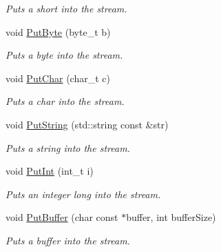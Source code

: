 \begin{DoxyCompactItemize}
\begin{DoxyCompactList}\small\item\em Puts a short into the stream. \end{DoxyCompactList}\item 
\hypertarget{class_common_1_1_network_serializer_ab5b1159c873c9edd318497c719eedc99}{void \hyperlink{class_common_1_1_network_serializer_ab5b1159c873c9edd318497c719eedc99}{Put\-Byte} (byte\-\_\-t b)}\label{class_common_1_1_network_serializer_ab5b1159c873c9edd318497c719eedc99}

\begin{DoxyCompactList}\small\item\em Puts a byte into the stream. \end{DoxyCompactList}\item 
\hypertarget{class_common_1_1_network_serializer_a35daf5250ffad493a6044d8089af1fc1}{void \hyperlink{class_common_1_1_network_serializer_a35daf5250ffad493a6044d8089af1fc1}{Put\-Char} (char\-\_\-t c)}\label{class_common_1_1_network_serializer_a35daf5250ffad493a6044d8089af1fc1}

\begin{DoxyCompactList}\small\item\em Puts a char into the stream. \end{DoxyCompactList}\item 
\hypertarget{class_common_1_1_network_serializer_a3fe79557a89ef5a84107802d3bf40a37}{void \hyperlink{class_common_1_1_network_serializer_a3fe79557a89ef5a84107802d3bf40a37}{Put\-String} (std\-::string const \&str)}\label{class_common_1_1_network_serializer_a3fe79557a89ef5a84107802d3bf40a37}

\begin{DoxyCompactList}\small\item\em Puts a string into the stream. \end{DoxyCompactList}\item 
\hypertarget{class_common_1_1_network_serializer_afe96d68e5efdd2d51a4acab621feba63}{void \hyperlink{class_common_1_1_network_serializer_afe96d68e5efdd2d51a4acab621feba63}{Put\-Int} (int\-\_\-t i)}\label{class_common_1_1_network_serializer_afe96d68e5efdd2d51a4acab621feba63}

\begin{DoxyCompactList}\small\item\em Puts an integer long into the stream. \end{DoxyCompactList}\item 
\hypertarget{class_common_1_1_network_serializer_a9cc1403e8ae617484e82e97364ce5e7d}{void \hyperlink{class_common_1_1_network_serializer_a9cc1403e8ae617484e82e97364ce5e7d}{Put\-Buffer} (char const $\ast$buffer, int buffer\-Size)}\label{class_common_1_1_network_serializer_a9cc1403e8ae617484e82e97364ce5e7d}

\begin{DoxyCompactList}\small\item\em Puts a buffer into the stream. \end{DoxyCompactList}\end{DoxyCompactItemize}


